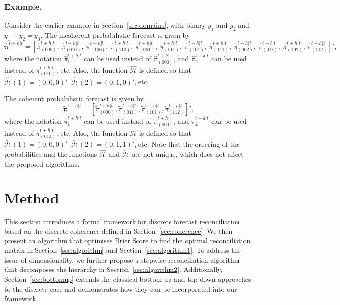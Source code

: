 \documentclass[a4paper,review,12pt,authoryear]{elsarticle}
\newcommand{\bpi}{\bm{\pi}}
\theoremstyle{definition}
\begin{document}
  \subsubsection*{\textbf{Example}.}

  Consider the earlier example in Section~\ref{sec:domains}, with binary $y_1$ and $y_2$ and $y_1+y_2=y_3$. The incoherent probabilistic forecast is given by
  \[
    \hat{\bpi}^{t+h|t}= \left[
      \hat{\pi}^{t+h|t}_{(000)}, ~
       \hat{\pi}^{t+h|t}_{(010)},~
       \hat{\pi}^{t+h|t}_{(100)},~
       \hat{\pi}^{t+h|t}_{(110)},~
       \hat{\pi}^{t+h|t}_{(001)},~
       \hat{\pi}^{t+h|t}_{(011)},~
       \hat{\pi}^{t+h|t}_{(101)},~
       \hat{\pi}^{t+h|t}_{(111)},~
       \hat{\pi}^{t+h|t}_{(002)},~
       \hat{\pi}^{t+h|t}_{(012)},~
       \hat{\pi}^{t+h|t}_{(102)},~
       \hat{\pi}^{t+h|t}_{(112)}
       \right]',
  \]
  where the notation $\hat{\pi}^{t+h|t}_{1}$ can be used instead of $\hat{\pi}^{t+h|t}_{(000)}$, and $\hat{\pi}^{t+h|t}_{2}$ can be used instead of $\hat{\pi}^{t+h|t}_{(010)}$, etc. Also, the function $\hat{\mathcal{H}}$ is defined so that $\hat{\mathcal{H}}(1)=(0,0,0)'$, $\hat{\mathcal{H}}(2)=(0,1,0)'$, etc.

  The coherent probabilistic forecast is given by
  \[
  \tilde{\bpi}^{t+h|t}=\left[
  \tilde{\pi}^{t+h|t}_{(000)},
  \tilde{\pi}^{t+h|t}_{(011)},
  \tilde{\pi}^{t+h|t}_{(101)},
  \tilde{\pi}^{t+h|t}_{(112)}
  \right]',\]
  where the notation $\tilde{\pi}^{t+h|t}_{1}$ can be used instead of $\tilde{\pi}^{t+h|t}_{(000)}$, and $\tilde{\pi}^{t+h|t}_{2}$ can be used instead of $\tilde{\pi}^{t+h|t}_{(011)}$, etc. Also, the function $\tilde{\mathcal{H}}$ is defined so that $\tilde{\mathcal{H}}(1)=(0,0,0)'$, $\tilde{\mathcal{H}}(2)=(0,1,1)'$, etc. Note that the ordering of the probabilities and the functions $\hat{\mathcal{H}}$ and $\tilde{\mathcal{H}}$ are not unique, which does not affect the proposed algorithms.

\section{Method}
\label{sec:method}

This section introduces a formal framework for discrete forecast reconciliation based on the discrete coherence defined in Section~\ref{sec:coherence}.
We then present an algorithm that optimises Brier Score to find the optimal reconciliation matrix in Section~\ref{sec:algorithm} and Section~\ref{sec:algorithm1}.
To address the issue of dimensionality, we further propose a stepwise reconciliation algorithm that decomposes the hierarchy in Section~\ref{sec:algorithm2}.
Additionally, Section~\ref{sec:bottomup} extends the classical bottom-up and top-down approaches to the discrete case and demonstrates how they can be incorporated into our framework.
\end{document}
